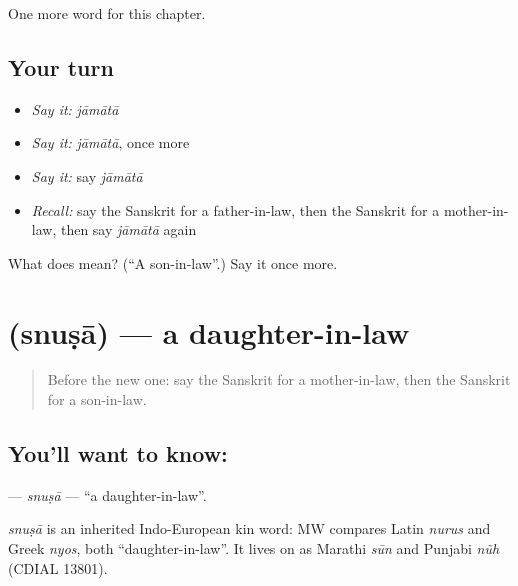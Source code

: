 \begin{grammarlens}[title={What you've built}]
One more word for this chapter.
\end{grammarlens}

\subsection*{Your turn}
\begin{itemize}
\raggedright
  \item \emph{Say it:} \emph{jāmātā}
  \item \emph{Say it:} \emph{jāmātā}, once more
  \item \emph{Say it:} say \emph{jāmātā}
  \item \emph{Recall:} say the Sanskrit for a father-in-law, then the Sanskrit for a mother-in-law, then say \emph{jāmātā} again
\end{itemize}

\begin{tcolorbox}[breakable,colback=teal!4,colframe=teal!35!black,title={Before you move on}]
What does  mean? (\textquotedblleft{}A son-in-law\textquotedblright{}.) Say it once more.
\end{tcolorbox}
\section[\texorpdfstring{\sk{स्नुषा} (snuṣā)}{स्नुषा (snuṣā)}]{ (snuṣā) — a daughter-in-law}

\label{lesson:SA-C178-snusa}



\begin{quote}
Before the new one: say the Sanskrit for a mother-in-law, then the Sanskrit for a son-in-law.
\end{quote}

\subsection*{You'll want to know: }
\textbf{} — \emph{snuṣā} — \textquotedblleft{}a daughter-in-law\textquotedblright{}.

\begin{cousinweb}
\emph{snuṣā} is an inherited Indo-European kin word: MW compares Latin \emph{nurus} and Greek \emph{nyos}, both \textquotedblleft{}daughter-in-law\textquotedblright{}. It lives on as Marathi \emph{sūn} and Punjabi \emph{nũh} (CDIAL 13801).
\end{cousinweb}

